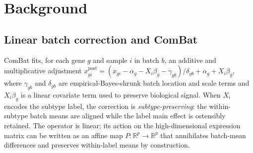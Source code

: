 \documentclass[11pt,a4paper]{article}
\begin{document}
\section{Background}
\label{sec:background}

\subsection{Linear batch correction and ComBat}
ComBat \citep{johnson2007combat} fits, for each gene $g$ and sample
$i$ in batch $b$, an additive and multiplicative adjustment
$x_{gi}^{\mathrm{post}} = (x_{gi} - \alpha_g - X_i\beta_g -
\gamma_{gb}) / \delta_{gb} + \alpha_g + X_i\beta_g$, where
$\gamma_{gb}$ and $\delta_{gb}$ are empirical-Bayes-shrunk batch
location and scale terms and $X_i\beta_g$ is a linear covariate term
used to preserve biological signal. When $X_i$ encodes the subtype
label, the correction is \emph{subtype-preserving}: the within-subtype
batch means are aligned while the label main effect is ostensibly
retained. The operator is linear; its action on the high-dimensional
expression matrix can be written as an affine map
$P: \mathbb{R}^{p} \to \mathbb{R}^{p}$ that annihilates batch-mean
differences and preserves within-label means by construction.
\end{document}
